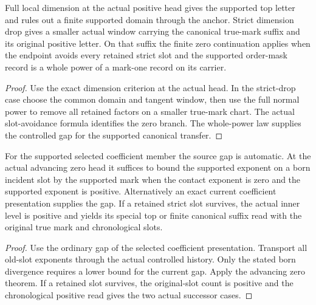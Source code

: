 \begin{theorem}
\label{hir:g1-exhaustive-actual-positive-head}
\leanok
Full local dimension at the actual positive head gives the
supported top letter and rules out a finite supported domain
through the anchor. Strict dimension drop gives a smaller
actual window carrying the canonical true-mark suffix and its
original positive letter. On that suffix the finite zero
continuation applies when the endpoint avoids every retained
strict slot and the supported order-mask record is a whole
power of a mark-one record on its carrier.
\end{theorem}
\begin{proof}
Use the exact dimension criterion at the actual head. In the
strict-drop case choose the common domain and tangent window,
then use the full normal power to remove all retained factors
on a smaller true-mark chart. The actual slot-avoidance formula
identifies the zero branch. The whole-power law supplies the
controlled gap for the supported canonical transfer.
\end{proof}

\begin{theorem}
\label{hir:g1-local-born-order-continuation}
\leanok
For the supported selected coefficient member the source gap
is automatic. At the actual advancing zero head it suffices
to bound the supported exponent on a born incident slot by
the supported mark when the contact exponent is zero and the
supported exponent is positive. Alternatively an exact
current coefficient presentation supplies the gap. If a
retained strict slot survives, the actual inner level is
positive and yields its special top or finite canonical suffix
read with the original true mark and chronological slots.
\end{theorem}
\begin{proof}
Use the ordinary gap of the selected coefficient presentation.
Transport all old-slot exponents through the actual controlled
history. Only the stated born divergence requires a lower
bound for the current gap. Apply the advancing zero theorem.
If a retained slot survives, the original-slot count is
positive and the chronological positive read gives the two
actual successor cases.
\end{proof}

